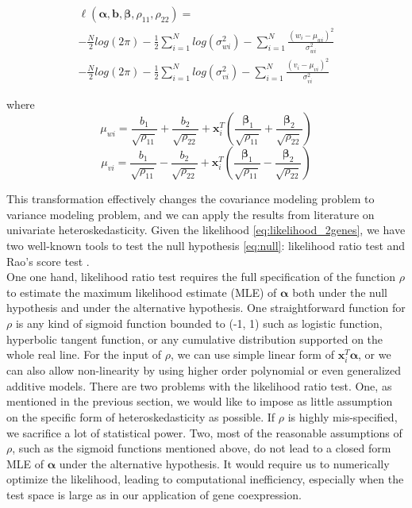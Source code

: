 \documentclass[aoas,preprint]{imsart}
\numberwithin{equation}{section}
\theoremstyle{plain}
\begin{document}
\begin{equation}
\begin{multlined}
\ell(\bm{\alpha}, \bm{b}, \bm{\beta}, \rho_{11}, \rho_{22}) = \\
-\frac{N}{2} log(2\pi) - \frac{1}{2} \sum_{i=1}^{N} log (\sigma_{wi}^2) - \sum_{i=1}^{N} \frac{(w_i - \mu_{wi})^2}{\sigma_{wi}^2}\\
-\frac{N}{2} log(2\pi) - \frac{1}{2} \sum_{i=1}^{N} log (\sigma_{vi}^2) - \sum_{i=1}^{N} \frac{(v_i - \mu_{vi})^2}{\sigma_{vi}^2}
\end{multlined}
    \label{eq:likelihood_2genes}
\end{equation}

where 
$$\mu_{wi} = \frac{{b}_1}{\sqrt{\rho_{11}}} + \frac{{b}_2}{\sqrt{\rho_{22}}} + \bm{x}_i^T \left(\frac{\bm{\beta}_1}{\sqrt{\rho_{11}}} + \frac{\bm{\beta}_2}{\sqrt{\rho_{22}}}\right)$$
$$\mu_{vi} = \frac{{b}_1}{\sqrt{\rho_{11}}} - \frac{{b}_2}{\sqrt{\rho_{22}}} + \bm{x}_i^T \left(\frac{\bm{\beta}_1}{\sqrt{\rho_{11}}} - \frac{\bm{\beta}_2}{\sqrt{\rho_{22}}}\right)$$

This transformation effectively changes the covariance modeling problem to variance modeling problem, and we can apply the results from literature on univariate heteroskedasticity. Given the likelihood \ref{eq:likelihood_2genes}, we have two well-known tools to test the null hypothesis \ref{eq:null}: likelihood ratio test and Rao's score test \cite{breusch1979simple}. \\


One one hand, likelihood ratio test requires the full specification of the function $\rho$ to estimate the maximum likelihood estimate (MLE) of $\bm{\alpha}$ both under the null hypothesis and under the alternative hypothesis. One straightforward function for $\rho$ is any kind of sigmoid function bounded to (-1, 1) such as logistic function, hyperbolic tangent function, or any cumulative distribution supported on the whole real line. For the input of $\rho$, we can use simple linear form of $\bm{x}_i^T\bm{\alpha}$, or we can also allow non-linearity by using higher order polynomial or even generalized additive models. There are two problems with the likelihood ratio test. One, as mentioned in the previous section, we would like to impose as little assumption on the specific form of heteroskedasticity as possible. If $\rho$ is highly mis-specified, we sacrifice a lot of statistical power. Two, most of the reasonable assumptions of $\rho$, such as the sigmoid functions mentioned above, do not lead to a closed form MLE of $\bm{\alpha}$ under the alternative hypothesis. It would require us to numerically optimize the likelihood, leading to computational inefficiency, especially when the test space is large as in our application of gene coexpression. \\
\end{document}
